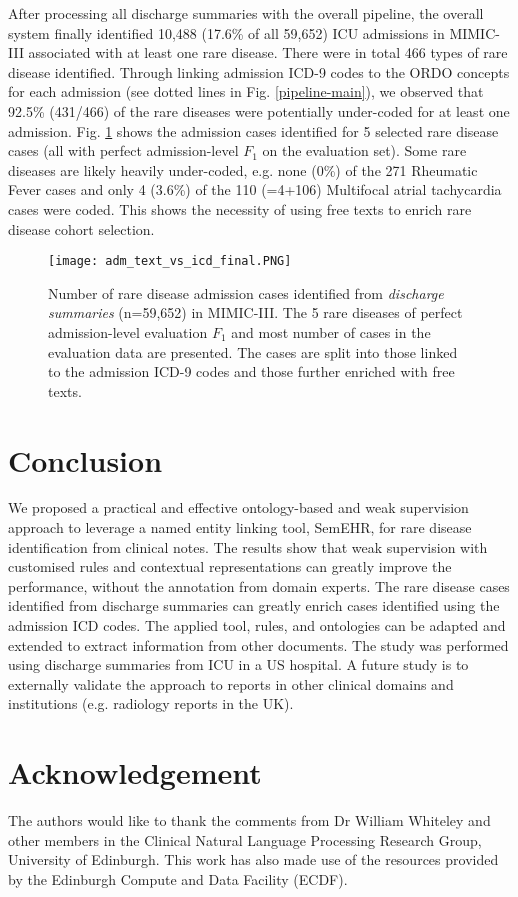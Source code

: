 \documentclass[letterpaper, 10 pt, conference]{ieeeconf}
\begin{document}
After processing all discharge summaries with the overall pipeline, the overall system finally identified 10,488 (17.6\% of all 59,652) ICU admissions in MIMIC-III associated with at least one rare disease. There were in total 466 types of rare disease identified. Through linking admission ICD-9 codes to the ORDO concepts for each admission (see dotted lines in Fig. \ref{pipeline-main}), we observed that 92.5\% (431/466) of the rare diseases were potentially under-coded for at least one admission. Fig. \ref{text_vs_icd_fig} shows the admission cases identified for 5 selected rare disease cases (all with perfect admission-level $F_1$ on the evaluation set). Some rare diseases are likely heavily under-coded, e.g. none (0\%) of the 271 Rheumatic Fever cases and only 4 (3.6\%) of the 110 (=4+106) Multifocal atrial tachycardia cases were coded. This shows the necessity of using free texts to enrich rare disease cohort selection.
\begin{figure}
  \centering
  \texttt{[image: adm\_text\_vs\_icd\_final.PNG]}
  \caption{Number of rare disease admission cases identified from \emph{discharge summaries} (n=59,652) in MIMIC-III. The 5 rare diseases of perfect admission-level evaluation $F_1$ and most number of cases in the evaluation data are presented. The cases are split into those linked to the admission ICD-9 codes and those further enriched with free texts.}\label{text_vs_icd_fig}
\end{figure}

\section{Conclusion}
We proposed a practical and effective ontology-based and weak supervision approach to leverage a named entity linking tool, SemEHR, for rare disease identification from clinical notes. The results show that weak supervision with customised rules and contextual representations can greatly improve the performance, without the annotation from domain experts. The rare disease cases identified from discharge summaries can greatly enrich cases identified using the admission ICD codes. The applied tool, rules, and ontologies can be adapted and extended to extract information from other documents. The study was performed using discharge summaries from ICU in a US hospital. A future study is to externally validate the approach to reports in other clinical domains and institutions (e.g. radiology reports in the UK).


\section*{Acknowledgement}

The authors would like to thank the comments from Dr William Whiteley and other members in the Clinical Natural Language Processing Research Group, University of Edinburgh. This work has also made use of the resources provided by the Edinburgh Compute and Data Facility (ECDF).



\end{document}
